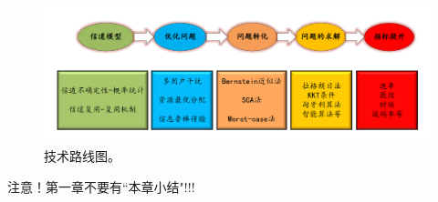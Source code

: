 \begin{figure}[H]
\centering
\includegraphics[width=16cm]{figures//chap1//技术路线图.pdf}
\caption{技术路线图。}
\label{技术路线图}
\end{figure}

注意！第一章不要有``本章小结"!!!
